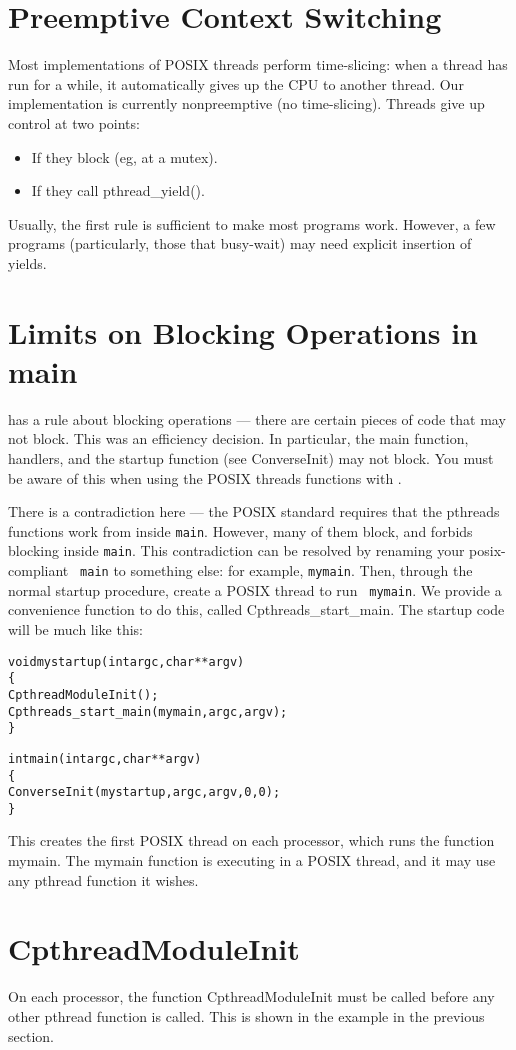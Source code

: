 \section{Preemptive Context Switching}

Most implementations of POSIX threads perform time-slicing: when a thread
has run for a while, it automatically gives up the CPU to another thread.
Our implementation is currently nonpreemptive (no time-slicing).  Threads
give up control at two points:

\begin{itemize}
\item{If they block (eg, at a mutex).}
\item{If they call pthread\_yield().}
\end{itemize}

Usually, the first rule is sufficient to make most programs work.
However, a few programs (particularly, those that busy-wait) may need
explicit insertion of yields.

\section{Limits on Blocking Operations in main}

\converse{} has a rule about blocking operations --- there are certain
pieces of code that may not block.  This was an efficiency decision.
In particular, the main function, \converse{} handlers, and the \converse{}
startup function (see ConverseInit) may not block.  You must be aware
of this when using the POSIX threads functions with \converse{}.

There is a contradiction here --- the POSIX standard requires that the
pthreads functions work from inside {\tt main}.  However, many of them
block, and \converse{} forbids blocking inside {\tt main}.  This
contradiction can be resolved by renaming your posix-compliant {\tt
main} to something else: for example, {\tt mymain}.  Then, through the
normal \converse{} startup procedure, create a POSIX thread to run {\tt
mymain}.  We provide a convenience function to do this, called
Cpthreads\_start\_main.  The startup code will be much like this:

\begin{alltt}
void mystartup(int argc, char **argv)
\{
  CpthreadModuleInit();
  Cpthreads_start_main(mymain, argc, argv);
\}

int main(int argc, char **argv)
\{
  ConverseInit(mystartup, argc, argv, 0, 0);
\}
\end{alltt}

This creates the first POSIX thread on each processor, which runs the
function mymain.  The mymain function is executing in a POSIX thread,
and it may use any pthread function it wishes.

\section{CpthreadModuleInit}

On each processor, the function CpthreadModuleInit must be called
before any other pthread function is called.  This is shown in the
example in the previous section.
